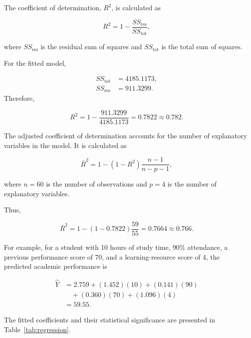 The coefficient of determination, $R^2$, is calculated as

\begin{equation}
R^2
=
1-\frac{SS_{\mathrm{res}}}{SS_{\mathrm{tot}}},
\end{equation}

where $SS_{\mathrm{res}}$ is the residual sum of squares and
$SS_{\mathrm{tot}}$ is the total sum of squares.

For the fitted model,

\begin{align*}
SS_{\mathrm{tot}} &= 4185.1173,\\
SS_{\mathrm{res}} &= 911.3299.
\end{align*}
Therefore,

\begin{equation}
R^2
=
1-\frac{911.3299}{4185.1173}
=
0.7822
\approx\mathbf{0.782}.
\end{equation}

The adjusted coefficient of determination accounts for the number of explanatory variables in the model. It is calculated as

\begin{equation}
\bar{R}^{2}
=
1-
\left(1-R^2\right)
\frac{n-1}{n-p-1},
\end{equation}

where $n=60$ is the number of observations and $p=4$ is the number of explanatory variables.

Thus,

\begin{equation}
\bar{R}^{2}
=
1-(1-0.7822)
\frac{59}{55}
=
0.7664
\approx\mathbf{0.766}.
\end{equation}

For example, for a student with 10 hours of study time, 90\% attendance, a previous performance score of 70, and a learning-resource score of 4, the predicted academic performance is

\begin{align*}
\widehat{Y}
&=2.759+(1.452)(10)+(0.141)(90)\\
&\quad +(0.360)(70)+(1.096)(4)\\
&=59.55.
\end{align*}

The fitted coefficients and their statistical significance are presented in Table~\ref{tab:regression}.

